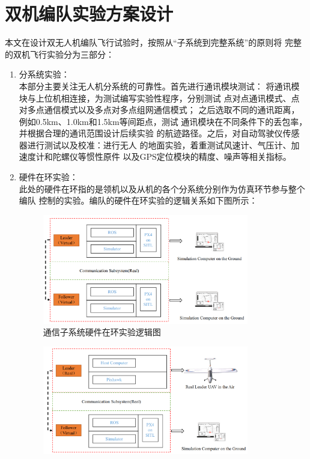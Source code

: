 \section{双机编队实验方案设计}
本文在设计双无人机编队飞行试验时，按照从“子系统到完整系统”的原则将
完整的双机飞行实验分为三部分：
\begin{enumerate}
    \item 分系统实验：\\
        本部分主要关注无人机分系统的可靠性。首先进行通讯模块测试：
        将通讯模块与上位机相连接，为测试编写实验性程序，分别测试
        点对点通讯模式、点对多点通信模式以及多点对多点组网通信模式；
        之后选取不同的通讯距离，例如0.5km、1.0km和1.5km等间距点，测试
        通讯模块在不同条件下的丢包率，并根据合理的通讯范围设计后续实验
        的航迹路径。之后，对自动驾驶仪传感器进行测试以及校准：进行无人
        的地面实验，着重测试风速计、气压计、加速度计和陀螺仪等惯性原件
        以及GPS定位模块的精度、噪声等相关指标。
    \item 硬件在环实验：\\
        此处的硬件在环指的是领机以及从机的各个分系统分别作为仿真环节参与整个编队
        控制的实验。编队的硬件在环实验的逻辑关系如下图所示：
        \begin{figure}[H]
            \centering
            \includegraphics[width=0.85\textwidth]{figures/adds/hard_loop_com}
            \caption{通信子系统硬件在环实验逻辑图}\label{fig：hard_loop_com}
        \end{figure}
        \begin{figure}[H]
            \centering
            \includegraphics[width=0.85\textwidth]{figures/adds/hard_loop_leader}

\end{figure}
\end{enumerate}
